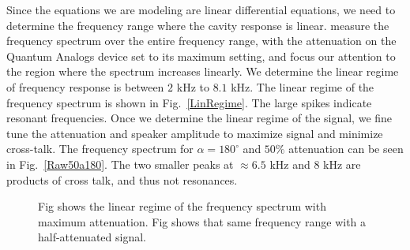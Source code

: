 \documentclass[12pt]{article}
\renewcommand{\deg}{^\circ} %
\newcommand{\figref}[1]{Fig.\ \ref{#1}}
\begin{document}
	Since the equations we are modeling are linear differential equations, we need to determine the frequency range where the cavity response is linear. measure the frequency spectrum over the entire frequency range, with the attenuation on the Quantum Analogs device set to its maximum setting, and focus our attention to the region where the spectrum increases linearly. We determine the linear regime of frequency response is between $2$ kHz to $8.1$ kHz. The linear regime of the frequency spectrum is shown in \figref{LinRegime}. The large spikes indicate resonant frequencies. Once we determine the linear regime of the signal, we fine tune the attenuation and speaker amplitude to maximize signal and minimize cross-talk. The frequency spectrum for $\alpha = 180\deg$ and $50\%$ attenuation can be seen in \figref{Raw50a180}. The two smaller peaks at $\approx 6.5$ kHz and $8$ kHz are products of cross talk, and thus not resonances.
	
	\begin{figure}[H]
		\captionsetup{justification = justified}
		\centering
		\qquad
		\caption{Fig \protect{} shows the linear regime of the frequency spectrum with maximum attenuation. Fig \protect{} shows that same frequency range with a half-attenuated signal.}
		\label{freqSpec}
	\end{figure}
	
	
	
\end{document}
